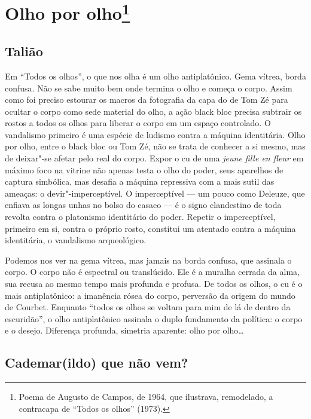 \section{Olho por olho\footnote{Poema de Augusto de
  Campos, de 1964, que ilustrava, remodelado, a contracapa de ``Todos os
  olhos'' (1973).}}



\subsection{Talião}

Em ``Todos os olhos'', o que nos olha é um olho
antiplatônico. Gema vítrea, borda confusa. Não se sabe muito bem onde
termina o olho e começa o corpo. Assim como foi preciso estourar os
macros da fotografia da capa do  de Tom Zé para ocultar o corpo como
sede material do olho, a ação black bloc precisa subtrair os rostos a
todos os olhos para liberar o corpo em um espaço controlado. O
vandalismo primeiro é uma espécie de ludismo contra a máquina
identitária. Olho por olho, entre o black bloc ou Tom Zé, não se trata
de conhecer a si mesmo, mas de deixar"-se afetar pelo real do corpo.
Expor o cu de uma \emph{jeune fille en fleur} em máximo foco na
vitrine não apenas testa o olho do poder, seus aparelhos de captura
simbólica, mas desafia a máquina repressiva com a mais sutil das
ameaças: o devir"-imperceptível. O imperceptível --- um pouco como
Deleuze, que enfiava as longas unhas no bolso do casaco --- é o signo
clandestino de toda revolta contra o platonismo identitário do poder.
Repetir o imperceptível, primeiro em si, contra o próprio rosto,
constitui um atentado contra a máquina identitária, o vandalismo
arqueológico.

Podemos nos ver na gema vítrea, mas jamais na borda confusa, que
assinala o corpo. O corpo não é espectral ou translúcido. Ele é a
muralha cerrada da alma, sua recusa ao mesmo tempo mais profunda e
profusa. De todos os olhos, o cu é o mais antiplatônico: a imanência
rósea do corpo, perversão da origem do mundo de Courbet. Enquanto
``todos os olhos se voltam para mim de lá de dentro da escuridão'', o
olho antiplatônico assinala o duplo fundamento da política: o corpo e o
desejo. Diferença profunda, simetria aparente: olho por olho\ldots{}

\subsection{Cademar(ildo) que não vem?}

